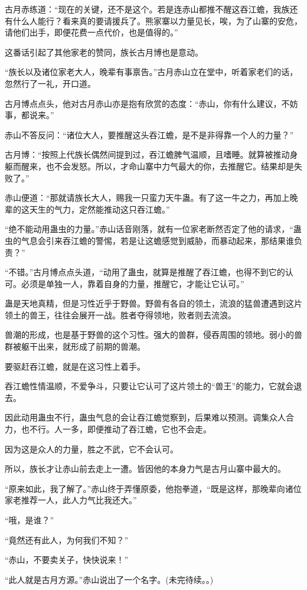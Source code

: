 \begin{this_body}
古月赤练道：“现在的关键，还不是这个。若是连赤山都推不醒这吞江蟾，我族还有什么人能行？看来真的要请援兵了。熊家寨以力量见长，唉，为了山寨的安危，请他们出手，即便花费一点代价，也是值得的。”

这番话引起了其他家老的赞同，族长古月博也是意动。

“族长以及诸位家老大人，晚辈有事禀告。”古月赤山立在堂中，听着家老们的话，忽然行了一礼，开口道。

古月博点点头，他对古月赤山亦是抱有欣赏的态度：“赤山，你有什么建议，不妨事，都说来。”

赤山不答反问：“诸位大人，要推醒这头吞江蟾，是不是非得靠一个人的力量？”

古月博：“按照上代族长偶然间提到过，吞江蟾脾气温顺，且嗜睡。就算被推动身躯而醒来，也不会发怒。所以，才命山寨中力气最大的你，去推醒它。结果却是失败了。”

赤山便道：“那就请族长大人，赐我一只蛮力天牛蛊。有了这一牛之力，再加上晚辈的这天生的气力，定然能推动这只吞江蟾。”

“绝不能动用蛊虫的力量。”赤山话音刚落，就有一位家老断然否定了他的请求，“蛊虫的气息会引来吞江蟾的警惕，若是让这蟾感觉到威胁，而暴动起来，那结果谁负责？”

“不错。”古月博点点头道，“动用了蛊虫，就算是推醒了吞江蟾，也得不到它的认可。必须是单独一人，靠着自身的力量，推醒它，才能让它认可。”

蛊是天地真精，但是习性近乎于野兽。野兽有各自的领土，流浪的猛兽遭遇到这片领土的兽王，往往会展开一战。胜者夺得领地，败者则去流浪。

兽潮的形成，也是基于野兽的这个习性。强大的兽群，侵吞周围的领地。弱小的兽群被躯干出来，就形成了前期的兽潮。

要驱赶吞江蟾，就是在这习性上着手。

吞江蟾性情温顺，不爱争斗，只要让它认可了这片领土的“兽王”的能力，它就会退去。

因此动用蛊虫不行，蛊虫气息的会让吞江蟾觉察到，后果难以预测。调集众人合力，也不行。人一多，即便推动了吞江蟾，它也不会走。

因为这是众人的力量，胜之不武，它不会认可。

所以，族长才让赤山前去走上一遭。皆因他的本身力气是古月山寨中最大的。

“原来如此，我了解了。”赤山终于弄懂原委，他抱拳道，“既是这样，那晚辈向诸位家老推荐一人，此人力气比我还大。”

“哦，是谁？”

“竟然还有此人，为何我们不知？”

“赤山，不要卖关子，快快说来！”

“此人就是古月方源。”赤山说出了一个名字。(未完待续。。)

\end{this_body}

